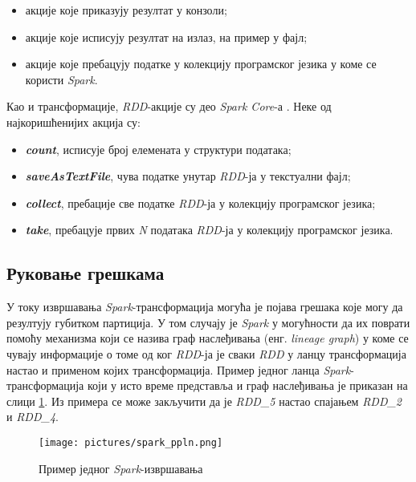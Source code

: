\documentclass[12pt,oneside]{memoir}
\begin{document}
\begin{itemize}
\item акције које приказују резултат у конзоли;
\item акције које исписују резултат на излаз, на пример у фајл;
\item акције које пребацују податке у колекцију програмског језика у коме се користи \textit{Spark}.
\end{itemize}

Као и трансформације, \textit{RDD}-акције су део \textit{Spark Core}-а  \cite{spark_rdd_transf}. Неке од најкоришћенијих акција су:

\begin{itemize}
	\item \textbf{\textit{count}}, исписује број елемената у структури података;
	\item \textbf{\textit{saveAsTextFile}}, чува податке унутар \textit{RDD}-ја у текстуални фајл;
	\item \textbf{\textit{collect}}, пребације све податке \textit{RDD}-ја у колекцију програмског језика;
	\item \textbf{\textit{take}}, пребацује првих \textit{N} података \textit{RDD}-ја у колекцију програмског језика.
\end{itemize}

\subsection{Руковање грешкама}
\label{subsec:spark_dags}

У току извршавања \textit{Spark}-трансформација могућа је појава грешака које могу да резултују губитком партиција. У том случају је \textit{Spark} у могућности да их поврати помоћу механизма који се назива граф наслеђивања (енг. \textit{lineage graph}) у коме се чувају информације о томе од ког \textit{RDD}-ја је сваки \textit{RDD} у ланцу трансформација настао и применом којих трансформација. Пример једног ланца \textit{Spark}-трансформација који у исто време представља и граф наслеђивања је приказан на  слици \ref{fig:sprk_ppln}. Из примера се може закључити да је \textit{RDD\_5} настао спајањем \textit{RDD\_2} и \textit{RDD\_4}.

\begin{figure}[!ht]
  \centering
  \texttt{[image: pictures/spark\_ppln.png]}
  \caption{Пример једног \textit{Spark}-извршавања}
  \label{fig:sprk_ppln}
\end{figure}
\end{document}
